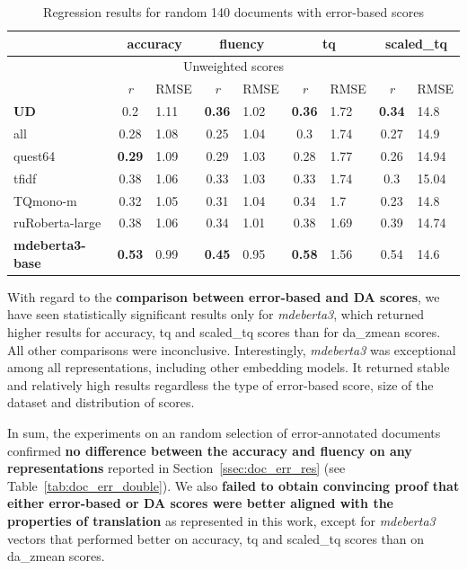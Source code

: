\begin{table}[H]
	\centering
	\begin{tabular}{l|cl|cl|cl|cl}
		\toprule
		& \multicolumn{2}{c|}{accuracy} & \multicolumn{2}{c|}{fluency}  & \multicolumn{2}{c|}{tq} & \multicolumn{2}{c}{scaled\_tq}    \\
		\midrule
		\multicolumn{9}{c}{Unweighted scores} \\
		\midrule
		& \textit{r}        & RMSE & \textit{r}       & RMSE & \textit{r}    & RMSE & \textit{r}    & RMSE  \\
		\midrule
		\textbf{UD}              & 0.2  & 1.11 & \textbf{0.36} & 1.02 & \textbf{0.36} & 1.72 & \textbf{0.34} & 14.8  \\
		all             & 0.28 & 1.08 & 0.25 & 1.04 & 0.3  & 1.74 & 0.27 & 14.9  \\
		quest64         & \textbf{0.29} & 1.09 & 0.29 & 1.03 & 0.28 & 1.77 & 0.26 & 14.94 \\
		\midrule
		tfidf           & 0.38 & 1.06 & 0.33 & 1.03 & 0.33 & 1.74 & 0.3  & 15.04 \\
		\midrule
		TQmono-m        & 0.32 & 1.05 & 0.31 & 1.04 & 0.34 & 1.7  & 0.23 & 14.8  \\
		ruRoberta-large & 0.38 & 1.06 & 0.34 & 1.01 & 0.38 & 1.69 & 0.39 & 14.74 \\
		\textbf{mdeberta3-base}  & \textbf{0.53} & 0.99 &\textbf{0.45} & 0.95 & \textbf{0.58} & 1.56 & 0.54 & 14.6 \\
		\bottomrule
	\end{tabular}
	\caption{\label{tab:err140rand_res}Regression results for random 140 documents with error-based scores}
\end{table}

With regard to the \textbf{comparison between error-based and DA scores}, we have seen statistically significant results only for \textit{mdeberta3}, which returned higher results for accuracy, tq and scaled\_tq scores than for da\_zmean scores. 
All other comparisons were inconclusive. Interestingly, \textit{mdeberta3} was exceptional among all representations, including other embedding models. It returned stable and relatively high results regardless the type of error-based score, size of the dataset and distribution of scores. 


In sum, the experiments on an random selection of error-annotated documents confirmed \textbf{no difference between the accuracy and fluency on any representations} reported in Section~\ref{ssec:doc_err_res} (see Table~\ref{tab:doc_err_double}). 
We also \textbf{failed to obtain convincing proof that either error-based or DA scores were better aligned with the properties of translation} as represented in this work, except for \textit{mdeberta3} vectors that performed better on accuracy, tq and scaled\_tq scores than on da\_zmean scores. 

